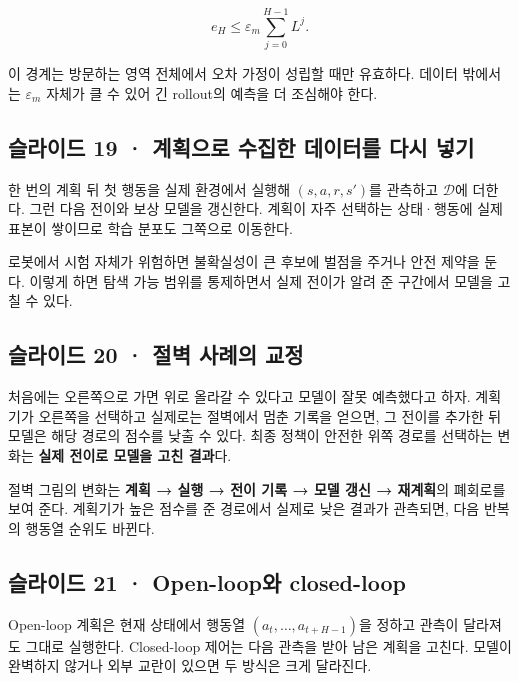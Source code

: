 \documentclass[11pt,a4paper]{article}
\begin{document}
\[
e_H\le\varepsilon_m\sum_{j=0}^{H-1}L^j.
\]

이 경계는 방문하는 영역 전체에서 오차 가정이 성립할 때만 유효하다. 데이터 밖에서는 $\varepsilon_m$ 자체가 클 수 있어 긴 rollout의 예측을 더 조심해야 한다.\par

\subsection{슬라이드 19 · 계획으로 수집한 데이터를 다시 넣기}

한 번의 계획 뒤 첫 행동을 실제 환경에서 실행해 $(s,a,r,s')$를 관측하고 $\mathcal D$에 더한다. 그런 다음 전이와 보상 모델을 갱신한다. 계획이 자주 선택하는 상태·행동에 실제 표본이 쌓이므로 학습 분포도 그쪽으로 이동한다.\par

로봇에서 시험 자체가 위험하면 불확실성이 큰 후보에 벌점을 주거나 안전 제약을 둔다. 이렇게 하면 탐색 가능 범위를 통제하면서 실제 전이가 알려 준 구간에서 모델을 고칠 수 있다.\par

\subsection{슬라이드 20 · 절벽 사례의 교정}

처음에는 오른쪽으로 가면 위로 올라갈 수 있다고 모델이 잘못 예측했다고 하자. 계획기가 오른쪽을 선택하고 실제로는 절벽에서 멈춘 기록을 얻으면, 그 전이를 추가한 뒤 모델은 해당 경로의 점수를 낮출 수 있다. 최종 정책이 안전한 위쪽 경로를 선택하는 변화는 \textbf{실제 전이로 모델을 고친 결과}다.\par

절벽 그림의 변화는 \textbf{계획 → 실행 → 전이 기록 → 모델 갱신 → 재계획}의 폐회로를 보여 준다. 계획기가 높은 점수를 준 경로에서 실제로 낮은 결과가 관측되면, 다음 반복의 행동열 순위도 바뀐다.\par

\subsection{슬라이드 21 · Open-loop와 closed-loop}

Open-loop 계획은 현재 상태에서 행동열 $(a_t,\ldots,a_{t+H-1})$을 정하고 관측이 달라져도 그대로 실행한다. Closed-loop 제어는 다음 관측을 받아 남은 계획을 고친다. 모델이 완벽하지 않거나 외부 교란이 있으면 두 방식은 크게 달라진다.\par
\end{document}
